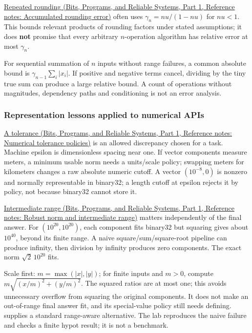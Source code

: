\href{../01-Bits-Programs-and-Reliable-Systems-P01/main.pdf\#nameddest=appendix-f82e270791c8}{Repeated rounding (Bits, Programs, and Reliable Systems, Part 1, Reference notes: Accumulated rounding error)} often uses \(\gamma_n=nu/(1-nu)\) for \(nu<1\). This bounds relevant products of rounding factors under stated assumptions; it does \textbf{not} promise that every arbitrary \(n\)-operation algorithm has relative error at most \(\gamma_n\).

For sequential summation of \(n\) inputs without range failures, a common absolute bound is \(\gamma_{n-1}\sum_i|x_i|\). If positive and negative terms cancel, dividing by the tiny true sum can produce a large relative bound. A count of operations without magnitudes, dependency paths and conditioning is not an error analysis.

\subsubsection{Representation lessons applied to numerical APIs}\label{05-engine-i-ch001-representation-lessons-applied-to-numerical-apis}

\hypertarget{05-engine-i-ch001-representation-lessons-applied-to-numerical-apis}{}

\href{../01-Bits-Programs-and-Reliable-Systems-P01/main.pdf\#nameddest=appendix-0ec599f8ba27}{A tolerance (Bits, Programs, and Reliable Systems, Part 1, Reference notes: Numerical tolerance policies)} is an allowed discrepancy chosen for a task. Machine epsilon is dimensionless spacing near one. If vector components measure meters, a minimum usable norm needs a units/scale policy; swapping meters for kilometers changes a raw absolute numeric cutoff. A vector \((10^{-8},0)\) is nonzero and normally representable in binary32; a length cutoff at epsilon rejects it by policy, not because binary32 cannot store it.

\href{../01-Bits-Programs-and-Reliable-Systems-P01/main.pdf\#nameddest=appendix-7f1e17dcafb1}{Intermediate range (Bits, Programs, and Reliable Systems, Part 1, Reference notes: Robust norm and intermediate range)} matters independently of the final answer. For \((10^{20},10^{20})\), each component fits binary32 but squaring gives about \(10^{40}\), beyond its finite range. A naive square/sum/square-root pipeline can produce infinity, then division by infinity produces zero components. The exact norm \(\sqrt2\,10^{20}\) fits.

Scale first: \(m=\max(|x|,|y|)\); for finite inputs and \(m>0\), compute \(m\sqrt{(x/m)^2+(y/m)^2}\). The squared ratios are at most one; this avoids unnecessary overflow from squaring the original components. It does not make an out-of-range final answer fit, and its special-value policy still needs defining.  supplies a standard range-aware alternative. The lab reproduces the naive failure and checks a finite hypot result; it is not a benchmark.

